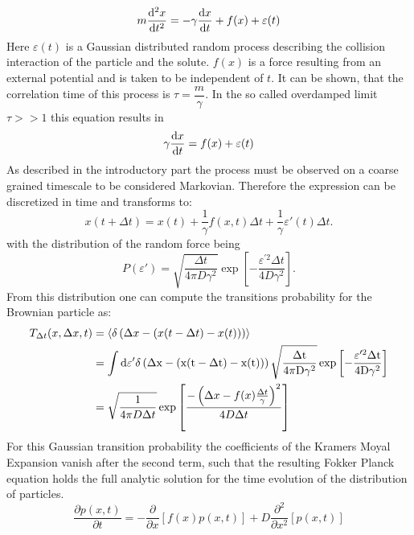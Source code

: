 \begin{equation}
    m \frac{{\rm d}^2 x}{{\rm d}t^2} = -\gamma \frac{ {\rm d}x}{{\rm d}t} + f(x) + \varepsilon(t)
    \label{Langewin equation}
\end{equation}
Here $\varepsilon(t)$ is a Gaussian distributed random process describing the collision interaction of the particle and the solute. $f(x)$ is a force resulting from an external potential and is taken to be independent of $t$. It can be shown, that the correlation time of this process is $\tau = \dfrac{m}{\gamma}$. In the so called overdamped limit $ \tau >> 1$ this equation results in
\begin{equation}
    \gamma \frac{ {\rm d}x}{{\rm d}t} = f(x) + \varepsilon(t)
    \label{BD1}
\end{equation}
As described in the introductory part the process must be observed on a coarse grained timescale to be considered Markovian. Therefore the expression can be discretized in time and transforms to:
\begin{equation}
        x(t + \Delta t) = x(t) + \frac{1}{\gamma}f(x,t) \Delta t + \frac{1}{\gamma} \varepsilon'(t) \Delta t.
    \label{overdamped limit}
\end{equation}
with the distribution of the random force being
\begin{equation}
    P(\varepsilon ' ) = \sqrt{\frac{\Delta t}{4 \pi D \gamma^{2}}} \exp \left[ - \frac{\varepsilon ^{\prime 2} \Delta t}{4 D \gamma^{2}} \right].
    \label{eps dist}
\end{equation}
From this distribution one can compute the transitions probability for the Brownian particle as:
\begin{align}
    T_{\Delta t}(x,\Delta x,t)  &= \left< \delta \left(  \Delta x - (x(t-\Delta t) - x(t)) \right)\right> \nonumber\\
                        &= \int \rm{d}\varepsilon ' \delta \left(  \Delta x - (x(t-\Delta t) - x(t)) \right)  \sqrt{\frac{\Delta t}{4 \pi D \gamma^{2}}} \exp \left[ - \frac{\varepsilon  ^{\prime 2} \Delta t}{4 D \gamma^{2}} \right] \nonumber\\
                        &= \sqrt{\frac{1}{4 \pi D \Delta t}} \exp \left[ \frac{-\left(\Delta x - f(x) \frac{\Delta t}{\gamma} \right)^2}{4 D \Delta t} \right]
    \label{T}
\end{align}
For this Gaussian transition probability the coefficients of the Kramers Moyal Expansion vanish after the second term, such that the resulting Fokker Planck equation holds the full analytic solution for the time evolution of the distribution of particles.
\begin{equation}
    \frac{\partial p(x,t)}{\partial t} = - \frac{\partial}{\partial x} \left[f(x)p(x,t) \right] + D\frac{\partial^2}{\partial x^2}\left[p(x,t) \right] 
    \label{FPE2}
\end{equation}

